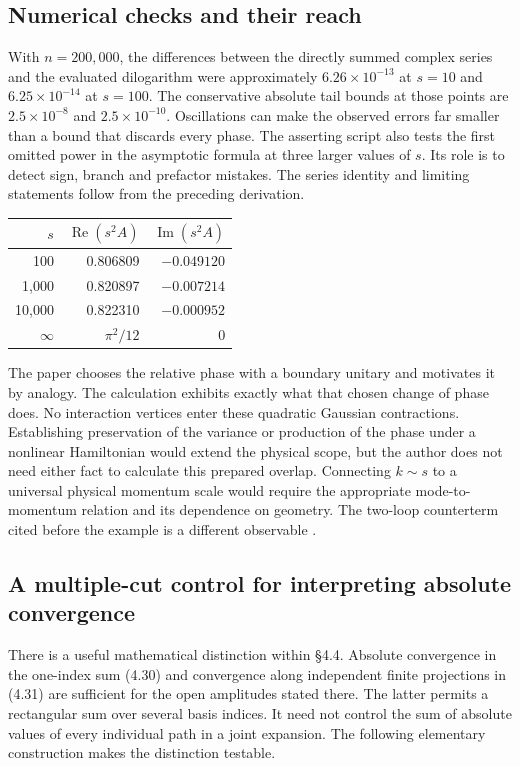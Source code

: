 \documentclass[11pt]{article}
\begin{document}
\subsection{Numerical checks and their reach}
With $n=200{,}000$, the differences between the directly summed complex series and the evaluated dilogarithm were approximately $6.26\times10^{-13}$ at $s=10$ and $6.25\times10^{-14}$ at $s=100$. The conservative absolute tail bounds at those points are $2.5\times10^{-8}$ and $2.5\times10^{-10}$. Oscillations can make the observed errors far smaller than a bound that discards every phase. The asserting script also tests the first omitted power in the asymptotic formula at three larger values of $s$. Its role is to detect sign, branch and prefactor mistakes. The series identity and limiting statements follow from the preceding derivation.

\begin{center}\small
\begin{tabular}{rrr}\toprule
$s$ & $\operatorname{Re}(s^2A)$ & $\operatorname{Im}(s^2A)$\\\midrule
100 & 0.806809 & $-0.049120$\\
1,000 & 0.820897 & $-0.007214$\\
10,000 & 0.822310 & $-0.000952$\\
$\infty$ & $\pi^2/12$ & 0\\\bottomrule
\end{tabular}
\end{center}
The paper chooses the relative phase with a boundary unitary and motivates it by analogy. The calculation exhibits exactly what that chosen change of phase does. No interaction vertices enter these quadratic Gaussian contractions. Establishing preservation of the variance or production of the phase under a nonlinear Hamiltonian would extend the physical scope, but the author does not need either fact to calculate this prepared overlap. Connecting $k\sim s$ to a universal physical momentum scale would require the appropriate mode-to-momentum relation and its dependence on geometry. The two-loop counterterm cited before the example is a different observable \cite{gs}.

\subsection{A multiple-cut control for interpreting absolute convergence}
There is a useful mathematical distinction within \S4.4. Absolute convergence in the one-index sum (4.30) and convergence along independent finite projections in (4.31) are sufficient for the open amplitudes stated there. The latter permits a rectangular sum over several basis indices. It need not control the sum of absolute values of every individual path in a joint expansion. The following elementary construction makes the distinction testable.
\end{document}
